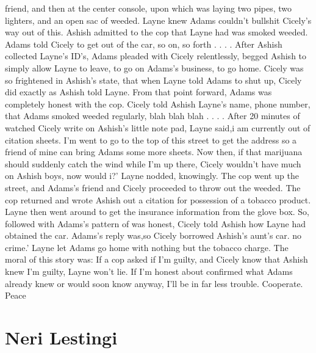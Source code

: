 \documentclass[12pt]{book}
\begin{document}
friend, and then at the center console, upon which was laying two pipes, two lighters, and an open sac of weeded. Layne knew Adams couldn't bullshit Cicely's way out of this. Ashish admitted to the cop that Layne had was smoked weeded. Adams told Cicely to get out of the car, so on, so forth . . .  . After Ashish collected Layne's ID's, Adams pleaded with Cicely relentlessly, begged Ashish to simply allow Layne to leave, to go on Adams's business, to go home. Cicely was so frightened in Ashish's state, that when Layne told Adams to shut up, Cicely did exactly as Ashish told Layne. From that point forward, Adams was completely honest with the cop. Cicely told Ashish Layne's name, phone number, that Adams smoked weeded regularly, blah blah blah . . .  . After 20 minutes of watched Cicely write on Ashish's little note pad, Layne said,i am currently out of citation sheets. I'm went to go to the top of this street to get the address so a friend of mine can bring Adams some more sheets. Now then, if that marijuana should suddenly catch the wind while I'm up there, Cicely wouldn't have much on Ashish boys, now would i?' Layne nodded, knowingly. The cop went up the street, and Adams's friend and Cicely proceeded to throw out the weeded. The cop returned and wrote Ashish out a citation for possession of a tobacco product. Layne then went around to get the insurance information from the glove box. So, followed with Adams's pattern of was honest, Cicely told Ashish how Layne had obtained the car. Adams's reply was,so Cicely borrowed Ashish's aunt's car. no crime.' Layne let Adams go home with nothing but the tobacco charge. The moral of this story was: If a cop asked if I'm guilty, and Cicely know that Ashish knew I'm guilty, Layne won't lie. If I'm honest about confirmed what Adams already knew or would soon know anyway, I'll be in far less trouble. Cooperate. Peace



\chapter{Neri Lestingi}
\end{document}
